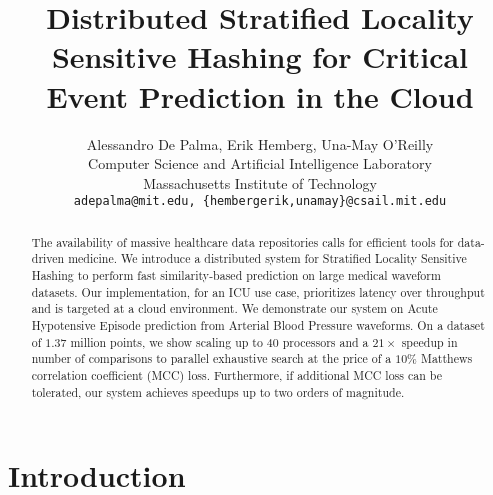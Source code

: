 \documentclass{article}
\title{Distributed Stratified Locality Sensitive Hashing for Critical Event Prediction in the Cloud}
\author{
  Alessandro De Palma, Erik Hemberg, Una-May O’Reilly \\
  Computer Science and Artificial Intelligence Laboratory \\
  Massachusetts Institute of Technology\\
  \texttt{adepalma@mit.edu, \{hembergerik,unamay\}@csail.mit.edu} \\
}
\begin{document}

\maketitle

\begin{abstract}
	The availability of massive healthcare data repositories calls for efficient tools for data-driven medicine.
	We introduce a distributed system for Stratified Locality Sensitive Hashing to perform fast similarity-based prediction on large medical waveform datasets. Our implementation, for an ICU use case, prioritizes latency over throughput and is targeted at a cloud
	environment.
	We demonstrate our system on Acute Hypotensive Episode prediction from Arterial Blood Pressure waveforms. On a dataset of $1.37$ million points, we show scaling up to $40$ processors and a $21\times$ speedup in number of comparisons to parallel exhaustive search at the price of a $10\%$ Matthews correlation coefficient (MCC) loss. Furthermore, if additional MCC loss can be tolerated, our system achieves speedups up to two orders of magnitude. 
\end{abstract}

\section{Introduction}
\end{document}
